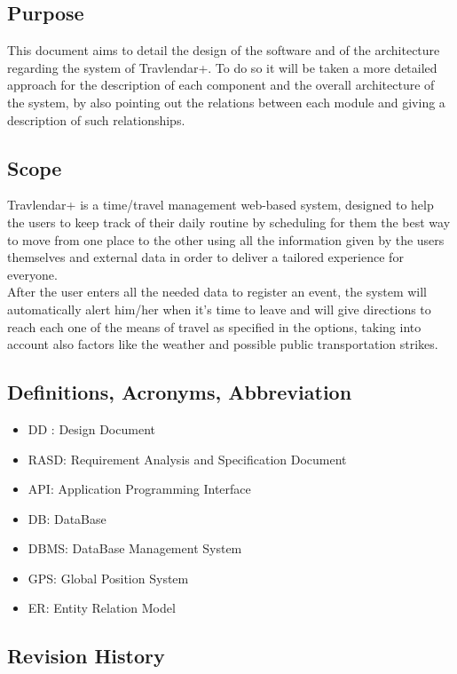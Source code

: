 \subsection{Purpose}
This document aims to detail the design of the software and of the architecture regarding the system of Travlendar+.
To do so it will be taken a more detailed approach for the description of each component and the overall architecture of the system, by also pointing out the relations between each module and giving a description of such relationships.

\subsection{Scope}
Travlendar+ is a time/travel management web-based system, designed to help the users to keep track of their daily routine by scheduling for them the best way to move from one place to the other using all the information given by the users themselves and external data in order to deliver a tailored experience for everyone.\\
After the user enters all the needed data to register an event, the system will automatically alert him/her when it’s time to leave and will give directions to reach each one of the means of travel as specified in the options, taking into account also factors like the weather and possible public transportation strikes.

\subsection{Definitions, Acronyms, Abbreviation}
\begin{itemize}
\item DD : Design Document
\item RASD: Requirement Analysis and Specification Document
\item API: Application Programming Interface
\item DB: DataBase
\item DBMS: DataBase Management System
\item GPS: Global Position System
\item ER: Entity Relation Model
\end{itemize}

\subsection{Revision History}

